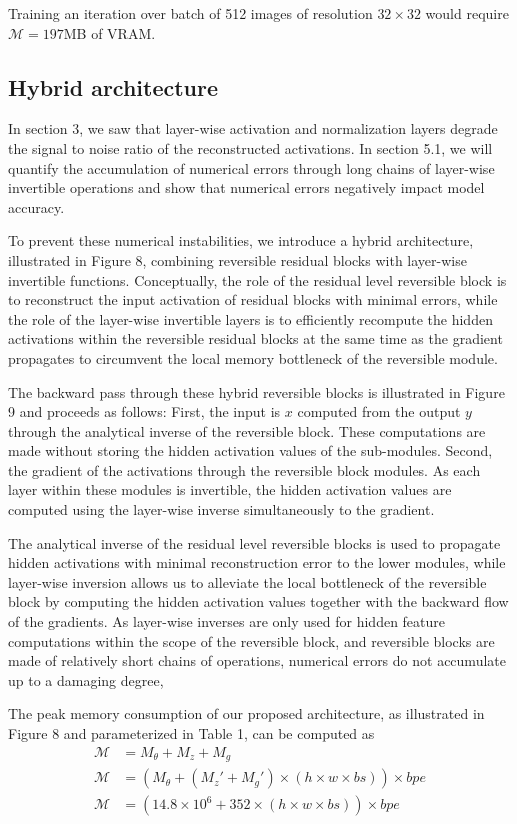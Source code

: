 \documentclass[twocolumn]{bmcart}
\begin{document}
Training an iteration over batch of 512 images of resolution $32 \times 32$ would require $\mathcal{M}=197$MB of VRAM. 

\subsection{Hybrid architecture}

In section 3, we saw that layer-wise activation and normalization layers degrade the signal to noise ratio of the reconstructed activations.
In section 5.1, we will quantify the accumulation of numerical errors through long chains of layer-wise invertible operations and show that numerical errors negatively impact model accuracy.

To prevent these numerical instabilities, we introduce a hybrid architecture, illustrated in Figure 8, combining reversible residual blocks with layer-wise invertible functions.
Conceptually, the role of the residual level reversible block is to reconstruct the input activation of residual blocks with minimal errors, 
while the role of the layer-wise invertible layers is to efficiently recompute the hidden activations within the reversible residual 
blocks at the same time as the gradient propagates to circumvent the local memory bottleneck of the reversible module.

The backward pass through these hybrid reversible blocks is illustrated in Figure 9 and proceeds as follows: 
First, the input is $x$ computed from the output $y$ through the analytical inverse of the reversible block.
These computations are made without storing the hidden activation values of the sub-modules.
Second, the gradient of the activations through the reversible block modules.
As each layer within these modules is invertible, the hidden activation values
are computed using the layer-wise inverse simultaneously to the gradient.

The analytical inverse of the residual level reversible blocks is used to propagate hidden activations with minimal reconstruction error to the lower modules,
while layer-wise inversion allows us to alleviate the local bottleneck of the reversible block by computing the hidden activation values together with the backward flow of the gradients. 
As layer-wise inverses are only used for hidden feature computations within the scope of the reversible block,
and reversible blocks are made of relatively short chains of operations,
numerical errors do not accumulate up to a damaging degree,

The peak memory consumption of our proposed architecture, as illustrated in Figure 8 and parameterized in Table 1, can be computed as  
\begin{subequations}
\begin{align}
\mathcal{M} &= M_{\theta} + M_{z} + M_{g} \\
\mathcal{M} &= (M_{\theta} + (M_z' + M_{g}') \times (h \times w \times bs)) \times bpe \\
\mathcal{M} &= (14.8 \times 10^6 + 352 \times (h \times w \times bs)) \times bpe \\
\end{align}
\end{subequations}
\end{document}
